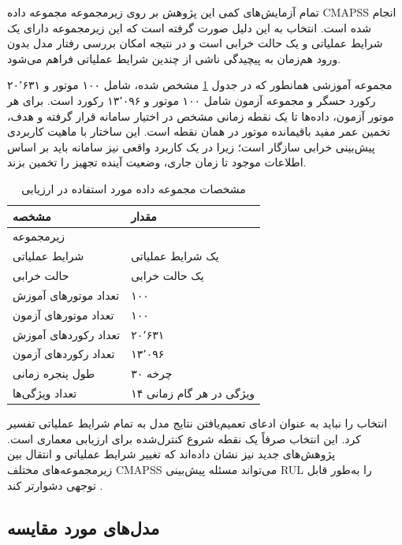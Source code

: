 تمام آزمایش‌های کمی این پژوهش بر روی زیرمجموعه  مجموعه داده \gls{CMAPSS} انجام شده است. انتخاب  به این دلیل صورت گرفته است که این زیرمجموعه دارای یک شرایط عملیاتی و یک حالت خرابی است و در نتیجه امکان بررسی رفتار مدل بدون ورود هم‌زمان به پیچیدگی ناشی از چندین شرایط عملیاتی فراهم می‌شود.

مجموعه آموزشی همانطور که در جدول 
\ref{tab:eval-data}
مشخص شده،
شامل ۱۰۰ موتور و ۲۰٬۶۳۱ رکورد حسگر و مجموعه آزمون شامل ۱۰۰ موتور و ۱۳٬۰۹۶ رکورد است. برای هر موتور آزمون، داده‌ها تا یک نقطه زمانی مشخص در اختیار سامانه قرار گرفته و هدف، تخمین عمر مفید باقیمانده موتور در همان نقطه است. این ساختار با ماهیت کاربردی پیش‌بینی خرابی سازگار است؛ زیرا در یک کاربرد واقعی نیز سامانه باید بر اساس اطلاعات موجود تا زمان جاری، وضعیت آینده تجهیز را تخمین بزند.

\begin{table}[ht]
	\centering
	\caption{مشخصات مجموعه داده مورد استفاده در ارزیابی}
	\label{tab:eval-data}
	\begin{tabular}{p{5cm}p{6cm}}
		\toprule
		\textbf{مشخصه} & \textbf{مقدار} \\
		\midrule
		زیرمجموعه & \lr{FD001} \\
		شرایط عملیاتی & یک شرایط عملیاتی \\
		حالت خرابی & یک حالت خرابی \\
		تعداد موتورهای آموزش & ۱۰۰ \\
		تعداد موتورهای آزمون & ۱۰۰ \\
		تعداد رکوردهای آموزش & ۲۰٬۶۳۱ \\
		تعداد رکوردهای آزمون & ۱۳٬۰۹۶ \\
		طول پنجره زمانی & ۳۰ چرخه \\
		تعداد ویژگی‌ها & ۱۴ ویژگی در هر گام زمانی \\
		\bottomrule
	\end{tabular}
\end{table}

انتخاب  را نباید به عنوان ادعای تعمیم‌یافتن نتایج مدل به تمام شرایط عملیاتی تفسیر کرد. این انتخاب صرفاً یک نقطه شروع کنترل‌شده برای ارزیابی معماری است. پژوهش‌های جدید نیز نشان داده‌اند که تغییر شرایط عملیاتی و انتقال بین زیرمجموعه‌های مختلف CMAPSS می‌تواند مسئله پیش‌بینی \gls{RUL} را به‌طور قابل توجهی دشوارتر کند \cite{diao2026reliable,song2026degradation}.



\subsection{مدل‌های مورد مقایسه}

